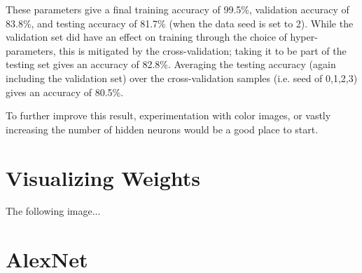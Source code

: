 \documentclass{article}
\begin{document}
   These parameters give a final training accuracy of 99.5\%, validation accuracy of 83.8\%, and
   testing accuracy of 81.7\% (when the data seed is set to 2). While the validation set did have an effect on training through the
   choice of hyper-parameters, this is mitigated by the cross-validation; taking it to be part of
   the testing set gives an accuracy of 82.8\%.
   Averaging the testing accuracy (again including the validation set) over the cross-validation
   samples (i.e. seed of 0,1,2,3) gives an accuracy of 80.5\%.

   To further improve this result, experimentation with color images, or vastly increasing the
   number of hidden neurons would be a good place to start.

   \section{Visualizing Weights}
   The following image...

   \section{AlexNet}
\end{document}

